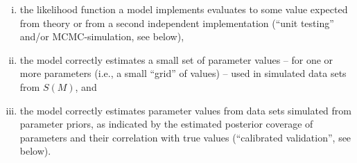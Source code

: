 \documentclass[oneside]{article}
\begin{document}
\begin{enumerate}[i.]
  \item the likelihood function a model
implements evaluates to some value expected from theory or from a
second independent implementation (``unit testing'' and/or MCMC-simulation, see
below),
  \item the model correctly estimates a small set of parameter
values -- for one or more parameters (i.e., a small ``grid'' of
values) -- used in simulated data sets from $S(M)$, and
  \item the model
correctly estimates parameter values from data sets simulated from
parameter priors, as indicated by the estimated posterior coverage of parameters
and their correlation with true values (``calibrated validation'', see
below). {\color{red}{If we want to talk about the next level, from
    those two other guys, we can add it as the 4th possibility and
    expand on it below}}
\end{enumerate}


\end{document}
